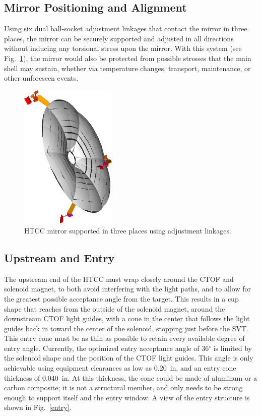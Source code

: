 \subsection{Mirror Positioning and Alignment}

Using six dual ball-socket adjustment linkages that contact the mirror in 
three places, the mirror can be securely supported and adjusted in all 
directions without inducing any torsional stress upon the mirror.  With 
this system (see Fig.~\ref{linkage}), the mirror would also be protected 
from possible stresses that the main shell may sustain, whether via 
temperature changes, transport, maintenance, or other unforeseen events. 

\begin{figure}[h]
\begin{centering}
\includegraphics[height=7.0cm,angle=-0]{Mechanical/CD_2_Cyril_6.eps}
\hspace{0.1cm}
\caption{\small{HTCC mirror supported in three places using adjustment 
linkages.}}
\label{linkage}
\end{centering}
\end{figure}

\subsection{Upstream and Entry}

The upstream end of the HTCC must wrap closely around the CTOF and 
solenoid magnet, to both avoid interfering with the light paths, and to 
allow for the greatest possible acceptance angle from the target. This 
results in a cup shape that reaches from the outside of the solenoid magnet, 
around the downstream CTOF light guides, with a cone in the center that 
follows the light guides back in toward the center of the solenoid, stopping 
just before the SVT.  This entry cone must be as thin as possible to retain 
every available degree of entry angle.  Currently, the optimized entry 
acceptance angle of 36$^\circ$ is limited by the solenoid shape and the 
position of the CTOF light guides.  This angle is only achievable using 
equipment clearances as low as 0.20~in, and an entry cone thickness of 
0.040~in.  At this thickness, the cone could be made of aluminum or a 
carbon composite; it is not a structural member, and only needs to be 
strong enough to support itself and the entry window.  A view of the entry 
structure is shown in Fig.~\ref{entry}.

